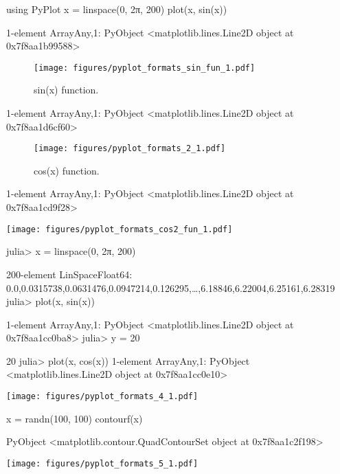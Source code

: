 \begin{juliacode}
using PyPlot
x = linspace(0, 2π, 200)
plot(x, sin(x))
\end{juliacode}
\begin{juliaout}
1-element Array{Any,1}:
 PyObject <matplotlib.lines.Line2D object at 0x7f8aa1b99588>
\end{juliaout}
\begin{figure}[ht]
\center
\texttt{[image: figures/pyplot\_formats\_sin\_fun\_1.pdf]}
\caption{sin(x) function.}
\label{fig:sin_fun}
\end{figure}

\begin{juliaout}
1-element Array{Any,1}:
 PyObject <matplotlib.lines.Line2D object at 0x7f8aa1d6cf60>
\end{juliaout}
\begin{figure}[htpb]
\center
\texttt{[image: figures/pyplot\_formats\_2\_1.pdf]}
\caption{cos(x) function.}
\end{figure}

\begin{juliaout}
1-element Array{Any,1}:
 PyObject <matplotlib.lines.Line2D object at 0x7f8aa1cd9f28>
\end{juliaout}
\texttt{[image: figures/pyplot\_formats\_cos2\_fun\_1.pdf]}

\begin{juliaterm}
julia> x = linspace(0, 2π, 200)

200-element LinSpace{Float64}:
 0.0,0.0315738,0.0631476,0.0947214,0.126295,…,6.18846,6.22004,6.25161,6.28319
julia> plot(x, sin(x))

1-element Array{Any,1}:
 PyObject <matplotlib.lines.Line2D object at 0x7f8aa1cc0ba8>
julia> y = 20

20
julia> plot(x, cos(x))
1-element Array{Any,1}:
 PyObject <matplotlib.lines.Line2D object at 0x7f8aa1cc0e10>
\end{juliaterm}
\texttt{[image: figures/pyplot\_formats\_4\_1.pdf]}

\begin{juliacode}
x = randn(100, 100)
contourf(x)
\end{juliacode}
\begin{juliaout}
PyObject <matplotlib.contour.QuadContourSet object at 0x7f8aa1c2f198>
\end{juliaout}
\texttt{[image: figures/pyplot\_formats\_5\_1.pdf]}
